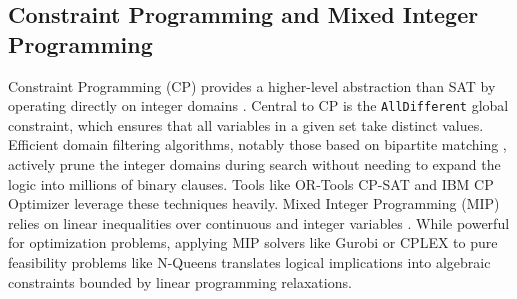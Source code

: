 \subsection{Constraint Programming and Mixed Integer Programming}
Constraint Programming (CP) provides a higher-level abstraction than SAT by operating directly on integer domains \citep{rossi2006handbook}. Central to CP is the \texttt{AllDifferent} global constraint, which ensures that all variables in a given set take distinct values. Efficient domain filtering algorithms, notably those based on bipartite matching \citep{regin1994filtering}, actively prune the integer domains during search without needing to expand the logic into millions of binary clauses. Tools like OR-Tools CP-SAT \citep{perron2019or} and IBM CP Optimizer leverage these techniques heavily.
Mixed Integer Programming (MIP) relies on linear inequalities over continuous and integer variables \citep{wolsey2020integer}. While powerful for optimization problems, applying MIP solvers like Gurobi or CPLEX to pure feasibility problems like N-Queens translates logical implications into algebraic constraints bounded by linear programming relaxations.
